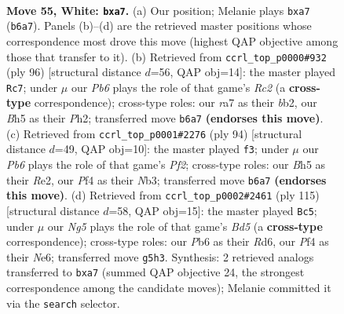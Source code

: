 \documentclass[11pt]{article}
\begin{document}
\clearpage

\begin{figure}[p]\centering
\begin{subfigure}{0.46\textwidth}\centering
\resizebox{\linewidth}{!}{%
\newchessgame
\chessboard[
  setfen={1nb3k1/r7/1P2p3/5pNB/1pN2P2/1Pn3P1/5K1P/1R6 w - - 1 55},
  showmover=false,
  pgfstyle=straightmove, color=movearrow, markmove={b6-a7}
]}
\caption{}
\end{subfigure}\hfill
\begin{subfigure}{0.46\textwidth}\centering
\resizebox{\linewidth}{!}{%
\newchessgame
\chessboard[
  setfen={8/5p1k/8/7p/4nNp1/pP2P1P1/1bR2PKP/8 w - - 1 49},
  showmover=false,
  pgfstyle=straightmove, color=movearrow, markmove={c2-c7}
]}
\caption{}
\end{subfigure}
\\[4pt]
\begin{subfigure}{0.46\textwidth}\centering
\resizebox{\linewidth}{!}{%
\newchessgame
\chessboard[
  setfen={8/b1p2p2/2B2k1p/3P2p1/2r5/1N1n2P1/P3RP1P/1K6 w - - 9 48},
  showmover=false,
  pgfstyle=straightmove, color=movearrow, markmove={f2-f3}
]}
\caption{}
\end{subfigure}\hfill
\begin{subfigure}{0.46\textwidth}\centering
\resizebox{\linewidth}{!}{%
\newchessgame
\chessboard[
  setfen={4k3/5pp1/3rn2p/3N3P/3bBP2/6PK/R7/8 b - - 24 58},
  showmover=false,
  pgfstyle=straightmove, color=movearrow, markmove={d4-c5}
]}
\caption{}
\end{subfigure}
\caption{\textbf{Move 55, White: \texttt{bxa7}.} (a) Our position; Melanie plays \texttt{bxa7} (\texttt{b6a7}). Panels (b)--(d) are the retrieved master positions whose correspondence most drove this move (highest QAP objective among those that transfer to it). (b) Retrieved from \texttt{ccrl\_top\_p0000\#932} (ply 96) [structural distance $d$=56, QAP obj=14]: the master played \texttt{Rc7}; under $\mu$ our \emph{Pb6} plays the role of that game's \emph{Rc2} (a \textbf{cross-type} correspondence); cross-type roles: our \emph{r}a7 as their \emph{b}b2, our \emph{B}h5 as their \emph{P}h2; transferred move \texttt{b6a7} \textbf{(endorses this move)}. (c) Retrieved from \texttt{ccrl\_top\_p0001\#2276} (ply 94) [structural distance $d$=49, QAP obj=10]: the master played \texttt{f3}; under $\mu$ our \emph{Pb6} plays the role of that game's \emph{Pf2}; cross-type roles: our \emph{B}h5 as their \emph{R}e2, our \emph{P}f4 as their \emph{N}b3; transferred move \texttt{b6a7} \textbf{(endorses this move)}. (d) Retrieved from \texttt{ccrl\_top\_p0002\#2461} (ply 115) [structural distance $d$=58, QAP obj=15]: the master played \texttt{Bc5}; under $\mu$ our \emph{Ng5} plays the role of that game's \emph{Bd5} (a \textbf{cross-type} correspondence); cross-type roles: our \emph{P}b6 as their \emph{R}d6, our \emph{P}f4 as their \emph{N}e6; transferred move \texttt{g5h3}. Synthesis: 2 retrieved analogs transferred to \texttt{bxa7} (summed QAP objective 24, the strongest correspondence among the candidate moves); Melanie committed it via the \texttt{search} selector.}
\label{fig:thought-m108}
\end{figure}
\end{document}
